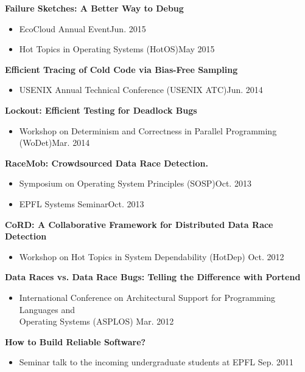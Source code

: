 \documentclass[10pt]{article}
\newcommand{\mysub}[3]{\textbf{#1} {#2} \hfill {\em #3}}
\begin{document}
\vspace{-2mm}
\mysub{Failure Sketches: A Better Way to Debug}{}{} 
\vspace{-2mm}
\begin{itemize}
\setlength\itemsep{0em}
\item{EcoCloud Annual Event}\hfill Jun. 2015
\item{Hot Topics in Operating Systems (HotOS)}\hfill May 2015
\end{itemize}
\vspace{-2mm}
\mysub{Efficient Tracing of Cold Code via Bias-Free Sampling}{}{} 
\vspace{-2mm}
\begin{itemize}
\setlength\itemsep{0em}
\item{USENIX Annual Technical Conference (USENIX ATC)}\hfill Jun. 2014
\end{itemize}
\vspace{-2mm}
\mysub{Lockout: Efficient Testing for Deadlock Bugs}{}{} 
\vspace{-2mm}
\begin{itemize}
\setlength\itemsep{0em}
\item{Workshop on Determinism and Correctness in Parallel Programming (WoDet)}\hfill Mar. 2014
\end{itemize}
\vspace{-2mm}
\mysub{RaceMob: Crowdsourced Data Race Detection.}{}{} 
\vspace{-2mm}
\begin{itemize}
\setlength\itemsep{0em}
\item{Symposium on Operating System Principles (SOSP)}\hfill Oct. 2013
\item{EPFL Systems Seminar}\hfill Oct. 2013
\end{itemize}
\vspace{-2mm}
\mysub{CoRD: A Collaborative Framework for Distributed Data Race Detection}{}{} 
\vspace{-2mm}
\begin{itemize}
\setlength\itemsep{0em}
\item{Workshop on Hot Topics in System Dependability (HotDep)} \hfill Oct. 2012
\end{itemize}
\vspace{-2mm}
\mysub{Data Races vs. Data Race Bugs: Telling the Difference with Portend}{}{} 
\vspace{-2mm}
\begin{itemize}
\setlength\itemsep{0em}
\item{International Conference on Architectural Support for Programming Languages and \\ Operating Systems (ASPLOS)} \hfill Mar. 2012
\end{itemize}
\vspace{-2mm}
\mysub{How to Build Reliable Software?}{}{} 
\vspace{-2mm}
\begin{itemize}
\setlength\itemsep{0em}
\item{Seminar talk to the incoming undergraduate students at EPFL} \hfill  Sep. 2011
\end{itemize}
\end{document}
